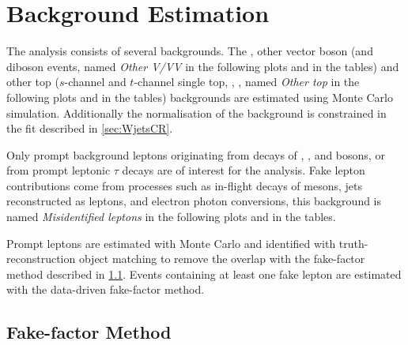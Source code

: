 \chapter{Background Estimation}%
\label{sec:bkg-estimation}

The analysis consists of several backgrounds. The \Wjets, other vector boson
(\Zjets and diboson events, named \emph{Other V/VV} in the following plots and in the tables) and other top (\(s\)-channel and \(t\)-channel
single top, \ttV, \ttH, named \emph{Other top} in the following plots and in the tables) backgrounds are estimated using Monte Carlo
simulation. Additionally the normalisation of the \Wjets background is
constrained in the fit described in \cref{sec:WjetsCR}.

Only prompt background leptons originating from decays of \Zboson, \Wboson, and
\Hboson bosons, or from prompt leptonic \( \tau \) decays are of interest for the analysis.
Fake lepton contributions come from processes such
as in-flight decays of mesons, jets reconstructed as leptons, and electron
photon conversions, this background is named \emph{Misidentified leptons} in the following plots and in the tables.

Prompt leptons are estimated with Monte Carlo and identified with truth-reconstruction
object matching to remove the overlap with the fake-factor method described
in \cref{sec:bkg-fakefactor}. Events containing at least one fake lepton
are estimated with the data-driven fake-factor method.





\FloatBarrier


\section{Fake-factor Method}%
\label{sec:bkg-fakefactor}

